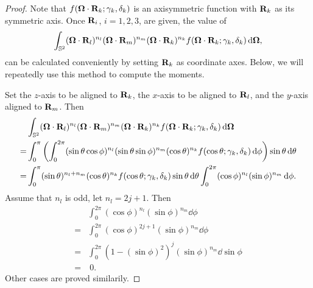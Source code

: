 \begin{proof}
  Note that $f(\boldsymbol{\Omega}\cdot\mathbf{R}_k; \gamma_k, \delta_k)$ is an 
  axisymmetric function with $\mathbf{R}_k$ as its symmetric axis.
  Once $\mathbf{R}_i$, $i=1,2,3$, are given, the value of
  \[
    \int_{\mathbb{S}^2} (\boldsymbol{\Omega}\cdot\mathbf{R}_l)^{n_l} (\boldsymbol{\Omega}\cdot\mathbf{R}_m)^{n_m}
    (\boldsymbol{\Omega} \cdot \mathbf{R}_k)^{n_k}
    f(\boldsymbol{\Omega}\cdot\mathbf{R}_k; \gamma_k, \delta_k)
    \,{\rm d}\boldsymbol{\Omega},
  \]
  can be calculated conveniently by setting $\mathbf{R}_k$ as coordinate
  axes. Below, we will repeatedly use this method to compute the moments. 

  Set the $z$-axis to be aligned to $\mathbf{R}_k$, the $x$-axis to 
  be aligned to $\mathbf{R}_l$, and the $y$-axis aligned to $\mathbf{R}_m$.
  Then
\[
  \begin{split}
    & \int_{\mathbb{S}^2} (\boldsymbol{\Omega}\cdot\mathbf{R}_l)^{n_l} (\boldsymbol{\Omega}\cdot\mathbf{R}_m)^{n_m}
    (\boldsymbol{\Omega}\cdot\mathbf{R}_k)^{n_k}
    f(\boldsymbol{\Omega}\cdot\mathbf{R}_k; \gamma_k, \delta_k)
    \,{\rm d}\boldsymbol{\Omega} \\
    = &  \int_0^\pi \left(\int_0^{2\pi} 
    (\sin\theta \cos\phi)^{n_l} (\sin\theta \sin\phi)^{n_m}
    (\cos\theta)^{n_k} f(\cos\theta; 
  \gamma_k,\delta_k) \,{\rm d}\phi\right) \sin\theta \,{\rm d}\theta \\
  = &  \int_0^\pi (\sin\theta )^{n_l + n_m} (\cos\theta)^{n_k}
  f(\cos\theta; \gamma_k,\delta_k) \sin\theta \,{\rm d}\theta
  \int_0^{2\pi} (\cos\phi)^{n_l} (\sin\phi)^{n_m} \,{\rm d}\phi. 
\end{split}
  \]
  Assume that $n_l$ is odd, let $n_l = 2 j + 1$.
  Then
  \[
    \begin{split}
      & \int_0^{2\pi} (\cos\phi)^{n_l} (\sin\phi)^{n_m} \dd\phi \\
      = & \int_0^{2\pi} (\cos\phi)^{2 j + 1} (\sin\phi)^{n_m} \dd\phi \\
      = & \int_0^{2\pi} (1-(\sin\phi)^2)^j (\sin\phi)^{n_m} \dd\sin\phi \\
      = & ~0.
    \end{split}
  \]
  Other cases are proved similarily.


\end{proof}
